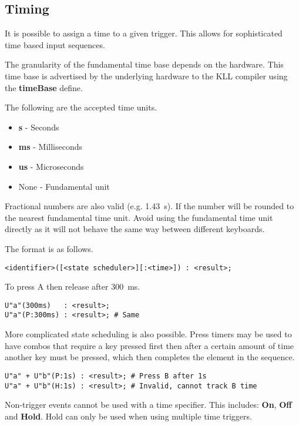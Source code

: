 \documentclass{kiibohd-template}
\begin{document}
\subsection{Timing}
\label{subsec:trigtiming}

It is possible to assign a time to a given trigger.
This allows for sophisticated time based input sequences.

The granularity of the fundamental time base depends on the hardware.
This time base is advertised by the underlying hardware to the KLL compiler using the \textbf{timeBase} define.

The following are the accepted time units.
\begin{itemize}
	\item \textbf{s} - Seconds
	\item \textbf{ms} - Milliseconds
	\item \textbf{us} - Microseconds
	\item None - Fundamental unit
\end{itemize}

Fractional numbers are also valid (e.g. 1.43~s).
If the number will be rounded to the nearest fundamental time unit.
Avoid using the fundamental time unit directly as it will not behave the same way between different keyboards.

The format is as follows.

\begin{lstlisting}
<identifier>([<state scheduler>][:<time>]) : <result>;
\end{lstlisting}

To press A then release after 300~ms.

\begin{lstlisting}
U"a"(300ms)   : <result>;
U"a"(P:300ms) : <result>; # Same
\end{lstlisting}

More complicated state scheduling is also possible.
Press timers may be used to have combos that require a key pressed first then after a certain amount of time another key must be pressed, which then completes the element in the sequence.

\begin{lstlisting}
U"a" + U"b"(P:1s) : <result>; # Press B after 1s
U"a" + U"b"(H:1s) : <result>; # Invalid, cannot track B time
\end{lstlisting}

Non-trigger events cannot be used with a time specifier.
This includes: \textbf{On}, \textbf{Off} and \textbf{Hold}.
Hold can only be used when using multiple time triggers.
\end{document}
